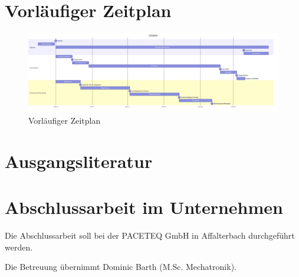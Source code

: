 \documentclass[12pt]{article} %
\begin{document}
\newpage

\section{Vorläufiger Zeitplan}

\begin{figure}[h!]
  \centering
  \includegraphics[width=1\textwidth]{Images/Gantt.png}
  \caption{Vorläufiger Zeitplan}
  \label{fig:gantt}
\end{figure}

\section{Ausgangsliteratur}
\printbibliography[title={""}]

\section{Abschlussarbeit im Unternehmen}

Die Abschlussarbeit soll bei der PACETEQ GmbH in Affalterbach durchgeführt werden.

Die Betreuung übernimmt Dominic Barth (M.Sc. Mechatronik).
\end{document}
